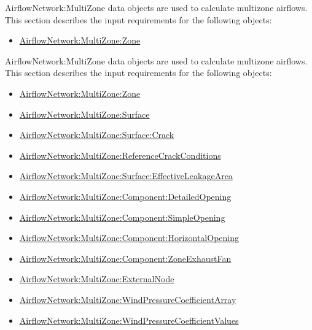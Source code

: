 AirflowNetwork:MultiZone data objects are used to calculate multizone airflows. This section describes the input requirements for the following objects:

\begin{itemize}
\tightlist
\item
  \hyperref[airflownetworkmultizonezone]{AirflowNetwork:MultiZone:Zone}
\end{itemize}

AirflowNetwork:MultiZone data objects are used to calculate multizone airflows. This section describes the input requirements for the following objects:

\begin{itemize}
\item
  \hyperref[airflownetworkmultizonezone]{AirflowNetwork:MultiZone:Zone}
\item
  \hyperref[airflownetworkmultizonesurface]{AirflowNetwork:MultiZone:Surface}
\item
  \hyperref[airflownetworkmultizonesurfacecrack]{AirflowNetwork:MultiZone:Surface:Crack}
\item
  \hyperref[airflownetworkmultizonereferencecrackconditions]{AirflowNetwork:MultiZone:ReferenceCrackConditions}
\item
  \hyperref[airflownetworkmultizonesurfaceeffectiveleakagearea]{AirflowNetwork:MultiZone:Surface:EffectiveLeakageArea}
\item
  \hyperref[airflownetworkmultizonecomponentdetailedopening]{AirflowNetwork:MultiZone:Component:DetailedOpening}
\item
  \hyperref[airflownetworkmultizonecomponentsimpleopening]{AirflowNetwork:MultiZone:Component:SimpleOpening}
\item
  \hyperref[airflownetworkmultizonecomponenthorizontalopening]{AirflowNetwork:MultiZone:Component:HorizontalOpening}
\item
  \hyperref[airflownetworkmultizonecomponentzoneexhaustfan]{AirflowNetwork:MultiZone:Component:ZoneExhaustFan}
\item
  \hyperref[airflownetworkmultizoneexternalnode]{AirflowNetwork:MultiZone:ExternalNode}
\item
  \hyperref[airflownetworkmultizonewindpressurecoefficientarray]{AirflowNetwork:MultiZone:WindPressureCoefficientArray}
\item
  \hyperref[airflownetworkmultizonewindpressurecoefficientvalues]{AirflowNetwork:MultiZone:WindPressureCoefficientValues}
\end{itemize}

